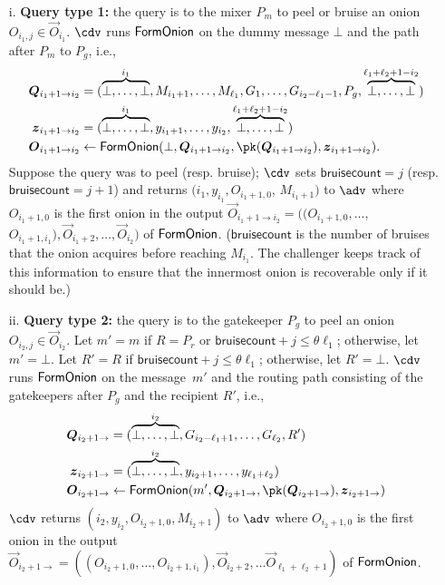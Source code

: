 \documentclass[runningheads,a4paper]{llncs}
\begin{document}
\begin{itemize}
\begin{enumerate}[resume]
\begin{enumerate}
    \item[i.] \textbf{Query type 1:} the query is to the mixer $P_m$ to peel or bruise an onion $O_{i_1, j}\in \vec{O}_{i_1}$. $\cdv$ runs $\mathsf{FormOnion}$ on 
    the dummy message $\bot$ and 
    the path after $P_m$ to $P_g$, i.e., 
    \begin{align*}
    \vec{Q}_{i_1+1 \rightarrow i_2} &= (\overbrace{\bot, \dots, \bot}^{i_1}, M_{i_1+1}, \dots, M_{\ell_1}, G_1, \dots, G_{i_2-\ell_1-1}, P_g, \overbrace{\bot, \dots, \bot}^{\ell_1+\ell_2+1-i_2}) \\
    \vec{z}_{i_1+1 \rightarrow i_2} &= (\overbrace{\bot, \dots, \bot}^{i_1}, y_{i_1+1}, \dots, y_{i_2}, \overbrace{\bot, \dots, \bot}^{\ell_1+\ell_2+1-i_2}) \\
    \vec{O}_{i_1+1\rightarrow i_2} &\gets \formonion(\bot, \vec{Q}_{i_1+1 \rightarrow i_2}, \pk(\vec{Q}_{i_1+1 \rightarrow i_2}), \vec{z}_{i_1+1\rightarrow i_2}).
    \end{align*}
    Suppose the query was to peel (resp. bruise); $\cdv$ sets $\mathsf{bruisecount}=j$ (resp. $\mathsf{bruisecount}=j+1$) and returns $(i_1, y_{i_1}, O_{i_1+1, 0}$, $M_{i_1+1})$ to $\adv$ where $O_{i_1+1, 0}$ is the first onion in the output $\vec{O}_{i_1+1\rightarrow i_2} = ((O_{i_1+1,0}, \dots$, $O_{i_1+1, i_1}), \vec{O}_{i_1 + 2}, \dots, \vec{O}_{i_2})$ of $\mathsf{FormOnion}$. ($\mathsf{bruisecount}$ is the number of bruises that the onion acquires before reaching $M_{i_1}$. The challenger keeps track of this information to ensure that the innermost onion is recoverable only if it should be.)
    
    \item[ii.] \textbf{Query type 2:} the query is to the gatekeeper $P_g$ to peel an onion $O_{i_2, j} \in \vec{O}_{i_2}$. 
    Let $m'=m$ if $R=P_r$ or $\mathsf{bruisecount}+j \le \theta \ell_1$; otherwise, let $m'=\bot$. 
    Let $R'=R$ if $\mathsf{bruisecount} + j \le \theta \ell_1$; otherwise, let $R'=\bot$. 
    $\cdv$ runs $\mathsf{FormOnion}$ on the message~$m'$ and the routing path consisting of the gatekeepers after $P_g$ and the recipient $R'$, i.e., 
    \begin{align*}
    \vec{Q}_{i_2+1 \rightarrow} &= (\overbrace{\bot, \dots, \bot}^{i_2}, G_{i_2-\ell_1+1}, \dots, G_{\ell_2}, R') \\
    \vec{z}_{i_2+1 \rightarrow} &= (\overbrace{\bot, \dots, \bot}^{i_2}, y_{i_2+1}, \dots, y_{\ell_1+\ell_2}) \\
    \vec{O}_{i_2+1 \rightarrow} &\gets \formonion(m', \vec{Q}_{i_2+1 \rightarrow}, \pk(\vec{Q}_{i_2+1 \rightarrow}), \vec{z}_{i_2+1 \rightarrow})
    \end{align*}
    $\cdv$ returns $(i_2, y_{i_2}, O_{i_2+1, 0}, M_{i_2+1})$ to $\adv$ where $O_{i_2+1, 0}$ is the first onion in the output $\vec{O}_{i_2+1 \rightarrow} = ((O_{i_2+1, 0}, \dots, O_{i_2+1, i_1}), \vec{O}_{i_2+2}, \dots \vec{O}_{\ell_1+\ell_2+1})$ of $\mathsf{FormOnion}$. 


\end{enumerate}
\end{enumerate}
\end{itemize}
\end{document}

